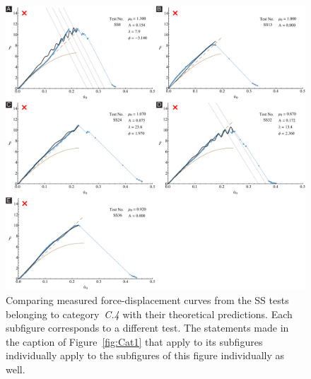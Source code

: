\documentclass[preprint,10pt,times]{elsarticle}
\numberwithin{equation}{section}
\begin{document}
\begin{figure}
\begin{centering}
\includegraphics[width=1\textwidth]{../Figures_Submit/Cat4.pdf}
\par\end{centering}
\centering{}\caption{\label{fig:Cat4}Comparing measured force-displacement curves from the SS tests belonging to category~\textit{C.4} with their theoretical predictions.
Each subfigure corresponds to a different test.
The statements made in the caption of Figure~\ref{fig:Cat1} that apply  to its subfigures individually apply to the subfigures of this figure individually as well.}
\end{figure}


\newpage



\end{document}
